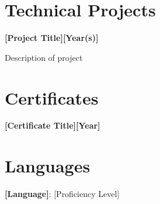 \documentclass[letterpaper,10pt]{article}
\newcommand{\heading}[2]{
  \hspace{10pt}#1\hfill#2\\
}
\newcommand{\headingBf}[2]{
  \heading{\textbf{#1}}{\textbf{#2}}
}
\newenvironment{resume_list}{
  \vspace{-7pt}
  \begin{itemize}[itemsep=-2px, parsep=1pt, leftmargin=30pt]
}{
  \end{itemize}
}
\begin{document}
\section{Technical Projects}
\headingBf{[Project Title]}{[Year(s)]}
\begin{resume_list}
    \item Description of project
\end{resume_list}

\section{Certificates}
 \headingBf{[Certificate Title]}{[Year]}

\section{Languages}
\textbf{[Language]}: [Proficiency Level]
\end{document}
